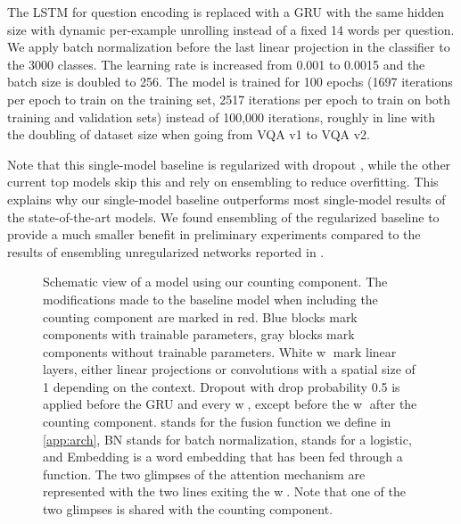 \documentclass[letterpaper]{article}
\begin{document}
The LSTM \citep{Hochreiter1997a} for question encoding is replaced with a GRU \citep{Cho2014a} with the same hidden size with dynamic per-example unrolling instead of a fixed 14 words per question.
We apply batch normalization \citep{Ioffe2015a} before the last linear projection in the classifier to the 3000 classes.
The learning rate is increased from 0.001 to 0.0015 and the batch size is doubled to 256.
The model is trained for 100 epochs (1697 iterations per epoch to train on the training set, 2517 iterations per epoch to train on both training and validation sets) instead of 100,000 iterations, roughly in line with the doubling of dataset size when going from VQA v1 to VQA v2.

Note that this single-model baseline is regularized with dropout \citep{Srivastava2014a}, while the other current top models skip this and rely on ensembling to reduce overfitting.
This explains why our single-model baseline outperforms most single-model results of the state-of-the-art models.
We found ensembling of the regularized baseline to provide a much smaller benefit in preliminary experiments compared to the results of ensembling unregularized networks reported in \citet{Teney2017a}.

\begin{figure}[htpb!]
    \centering
    \caption{
        Schematic view of a model using our counting component.
        The modifications made to the baseline model when including the counting component are marked in red.
        Blue blocks mark components with trainable parameters, gray blocks mark components without trainable parameters.
        White \textcircled{w} mark linear layers, either linear projections or convolutions with a spatial size of 1 depending on the context.
        Dropout with drop probability 0.5 is applied before the GRU and every \textcircled{w}, except before the \textcircled{w} after the counting component.
        \Large  \normalsize stands for the fusion function we define in \autoref{app:arch}, BN stands for batch normalization,  stands for a logistic, and Embedding is a word embedding that has been fed through a  function.
        The two glimpses of the attention mechanism are represented with the two lines exiting the \textcircled{w}.
        Note that one of the two glimpses is shared with the counting component.
    }
    \label{fig:model}
\end{figure}
\end{document}

